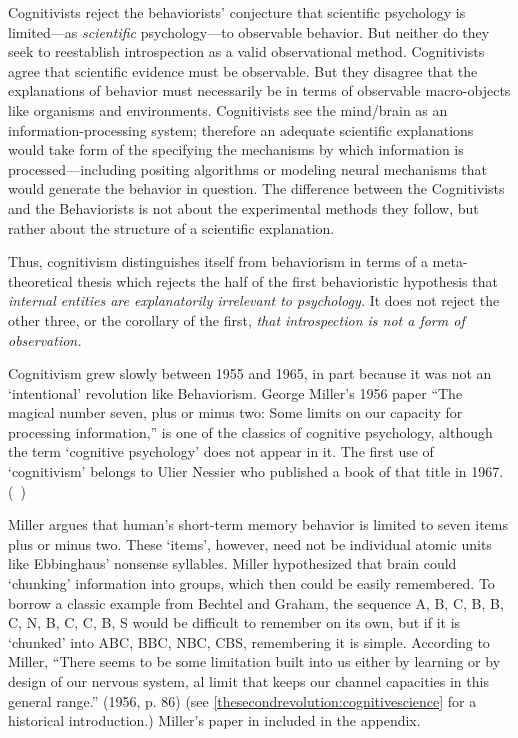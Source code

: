 \begin{refsection}
Cognitivists reject the behaviorists' conjecture that scientific psychology is limited—as \emph{scientific} psychology—to observable behavior. But neither do they seek to reestablish introspection as a valid observational method. Cognitivists agree that scientific evidence must be observable. But they disagree that the explanations of behavior must necessarily be in terms of observable macro-objects like organisms and environments. Cognitivists see the mind\slash brain as an information-processing system; therefore an adequate scientific explanations would take form of the specifying the mechanisms by which information is processed—including positing algorithms or modeling neural mechanisms that would generate the behavior in question. The difference between the Cognitivists and the Behaviorists is not about the experimental methods they follow, but rather about the structure of a scientific explanation.

Thus, cognitivism distinguishes itself from behaviorism in terms of a meta-theoretical thesis which rejects the half of the first behavioristic hypothesis that \emph{internal entities are explanatorily irrelevant to psychology.} It does not reject the other three, or the corollary of the first, \emph{that introspection is not a form of observation.}

Cognitivism grew slowly between 1955 and 1965, in part because it was not an `intentional' revolution like Behaviorism. George Miller's 1956 paper “The magical number seven, plus or minus two: Some limits on our capacity for processing information,” is one of the classics of cognitive psychology, although the term `cognitive psychology' does not appear in it. The first use of ‘cognitivism’ belongs to Ulier Nessier who published a book of that title in 1967. (~\citep{Neisser:2014wn})

Miller argues that human's short-term memory behavior is limited to seven items plus or minus two. These `items', however, need not be individual atomic units like Ebbinghaus' nonsense syllables. Miller hypothesized that brain could `chunking' information into groups, which then could be easily remembered. To borrow a classic example from Bechtel and Graham, the sequence A, B, C, B, B, C, N, B, C, C, B, S would be difficult to remember on its own, but if it is `chunked' into ABC, BBC, NBC, CBS, remembering it is simple. According to Miller, “There seems to be some limitation built into us either by learning or by design of our nervous system, al limit that keeps our channel capacities in this general range.” (1956, p. 86) (see \ref{thesecondrevolution:cognitivescience} for a historical introduction.) Miller's paper in included in the appendix.


\end{refsection}
